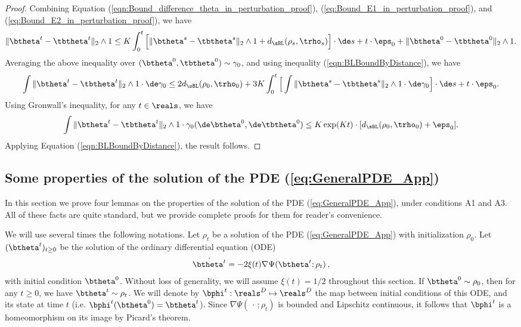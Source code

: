 \documentclass[11pt]{article}
\begin{document}
\begin{proof}
Combining Equation (\ref{eqn:Bound_difference_theta_in_perturbation_proof}), (\ref{eq:Bound_E1_in_perturbation_proof}), and (\ref{eq:Bound_E2_in_perturbation_proof}), we have
\begin{align}
\| \btheta^t - \tbtheta^t \|_2 \wedge 1 \le K \int_0^t \Big [ \| \btheta^s - \tbtheta^s \|_2 \wedge 1 + d_{\sBL}(\rho_s, \trho_s)  \Big] \cdot  \de s  + t \cdot \eps_0 + \| \btheta^0 - \tbtheta^0 \|_2 \wedge 1.
\end{align}
Averaging the above inequality over $(\btheta^0, \tbtheta^0) \sim \gamma_0$, and using inequality (\ref{eqn:BLBoundByDistance}), we have
\begin{align}
\int \| \btheta^t - \tbtheta^t \|_2 \wedge 1 \cdot \de \gamma_0 \le 2 d_{\sBL}(\rho_0, \trho_0) + 3 K  \int_0^t \Big [ \int \| \btheta^s - \tbtheta^s \|_2 \wedge 1 \cdot \de \gamma_0\Big] \cdot  \de s  + t \cdot \eps_0.
\end{align}
Using Gronwall's inequality, for any $t \in \reals$, we have 
\[
\begin{aligned}
\int \| \btheta^t - \tbtheta^t \|_2 \wedge 1 \cdot \gamma_0(\de \btheta^0, \de \tbtheta^0) \le K\exp(K t ) \cdot [d_{\sBL}(\rho_0, \trho_0) + \eps_0]. 
\end{aligned}
\]
Applying Equation (\ref{eqn:BLBoundByDistance}), the result follows.
\end{proof}

\subsection{Some properties of the solution of the PDE (\ref{eq:GeneralPDE_App})}


In this section we prove four lemmas on the properties of the solution of the PDE (\ref{eq:GeneralPDE_App}), under conditions {\sf A1} and {\sf A3}.
All of these facts are quite standard, but we provide complete proofs for them for reader's convenience.

We will use several times the following notations.
Let $\rho_t$ be a solution of the PDE (\ref{eq:GeneralPDE_App}) with initialization $\rho_0$.  Let $(\btheta^t)_{t\ge 0}$ be the solution
of the ordinary differential equation (ODE)
%
\begin{align}
%
\dot{\btheta^t} = -2 \xi(t) \nabla \Psi(\btheta^t;\rho_t)\, ,\label{eq:ODE_Density_generalized}
%
\end{align}
%
with initial condition $\btheta^0$. Without loss of generality, we will assume $\xi(t) = 1/2$ throughout this section. If $\btheta^0 \sim \rho_0$, then for any $t\ge 0$, we have $\btheta^t\sim\rho_t$. 
We will denote by $\bphi^t:\reals^D\mapsto\reals^D$ the map between initial conditions of this ODE, and its state at time $t$
(i.e. $\bphi^t(\btheta^0)=\btheta^t$). Since $\nabla \Psi(\,\cdot\, ;\rho_t)$ is bounded and Lipschitz continuous, 
it follows that $\bphi^t$ is a homeomorphism on its image by Picard's theorem. 
\end{document}
